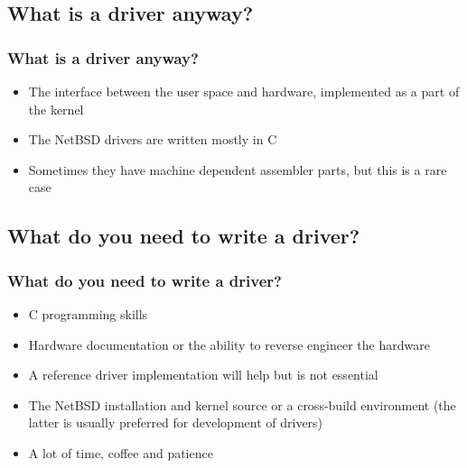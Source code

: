 \documentclass[dvipsnames,table]{beamer}
\begin{document}
\subsection{What is a driver anyway?}

\begin{frame}
\frametitle{What is a driver anyway?}
\begin{itemize}
	\item The interface between the user space and hardware, implemented as a part of the kernel
	\item The NetBSD drivers are written mostly in C
	\item Sometimes they have machine dependent assembler parts, but this is a rare case
\end{itemize}
\end{frame}

\subsection{What do you need to write a driver?}

\begin{frame}
\frametitle{What do you need to write a driver?}
\begin{itemize}
	\item C programming skills
	\item Hardware documentation or the ability to reverse engineer the hardware
	\item A reference driver implementation will help but is not essential
	\item The NetBSD installation and kernel source or a cross-build environment (the latter is usually preferred for development of drivers)
	\item A lot of time, coffee and patience {\Large \smiley}
\end{itemize}
\end{frame}
\end{document}
